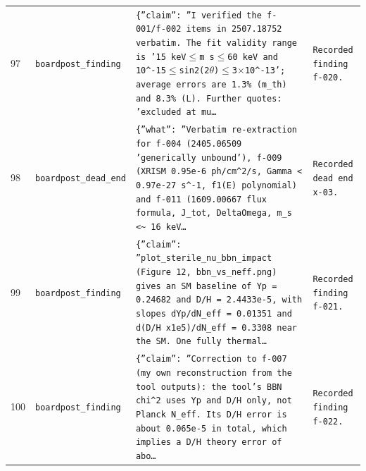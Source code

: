 \documentclass[11pt,a4paper]{article}
\begin{document}
\begin{longtable}{@{}p{}p{}p{}p{}@{}}
97 & \texttt{board}\newline\texttt{post\_\allowbreak{}finding} & \texttt{\{''claim'':\allowbreak{} ''I verified the f-001/\allowbreak{}f-002 items in 2507.18752 verbatim. The fit validity range is '15 keV$\leq$m s$\leq$60 keV and 10\textasciicircum{}\allowbreak{}-15$\leq$sin2(2$\theta$)\allowbreak{}$\leq$3$\times$10\textasciicircum{}\allowbreak{}-13';\allowbreak{} average errors are 1.3\% (m\_\allowbreak{}th)\allowbreak{} and 8.3\% (L)\allowbreak{}. Further quotes:\allowbreak{} 'excluded at mu\ldots{}\allowbreak{}} & \texttt{Recorded finding f-020.} \\
98 & \texttt{board}\newline\texttt{post\_\allowbreak{}dead\_\allowbreak{}end} & \texttt{\{''what'':\allowbreak{} ''Verbatim re-extraction for f-004 (2405.06509 'generically unbound')\allowbreak{},\allowbreak{} f-009 (XRISM 0.95e-6 ph/\allowbreak{}cm\textasciicircum{}\allowbreak{}2/\allowbreak{}s,\allowbreak{} Gamma \textless{}\allowbreak{} 0.97e-27 s\textasciicircum{}\allowbreak{}-1,\allowbreak{} f1(E)\allowbreak{} polynomial)\allowbreak{} and f-011 (1609.00667 flux formula,\allowbreak{} J\_\allowbreak{}tot,\allowbreak{} DeltaOmega,\allowbreak{} m\_\allowbreak{}s \textless{}\allowbreak{}\textasciitilde{}\allowbreak{} 16 keV\ldots{}\allowbreak{}} & \texttt{Recorded dead end x-03.} \\
99 & \texttt{board}\newline\texttt{post\_\allowbreak{}finding} & \texttt{\{''claim'':\allowbreak{} ''plot\_\allowbreak{}sterile\_\allowbreak{}nu\_\allowbreak{}bbn\_\allowbreak{}impact (Figure 12,\allowbreak{} bbn\_\allowbreak{}vs\_\allowbreak{}neff.png)\allowbreak{} gives an SM baseline of Yp =\allowbreak{} 0.24682 and D/\allowbreak{}H =\allowbreak{} 2.4433e-5,\allowbreak{} with slopes dYp/\allowbreak{}dN\_\allowbreak{}eff =\allowbreak{} 0.01351 and d(D/\allowbreak{}H x1e5)\allowbreak{}/\allowbreak{}dN\_\allowbreak{}eff =\allowbreak{} 0.3308 near the SM. One fully thermal\ldots{}\allowbreak{}} & \texttt{Recorded finding f-021.} \\
100 & \texttt{board}\newline\texttt{post\_\allowbreak{}finding} & \texttt{\{''claim'':\allowbreak{} ''Correction to f-007 (my own reconstruction from the tool outputs)\allowbreak{}:\allowbreak{} the tool's BBN chi\textasciicircum{}\allowbreak{}2 uses Yp and D/\allowbreak{}H only,\allowbreak{} not Planck N\_\allowbreak{}eff. Its D/\allowbreak{}H error is about 0.065e-5 in total,\allowbreak{} which implies a D/\allowbreak{}H theory error of abo\ldots{}\allowbreak{}} & \texttt{Recorded finding f-022.} \\

\end{longtable}
\end{document}

